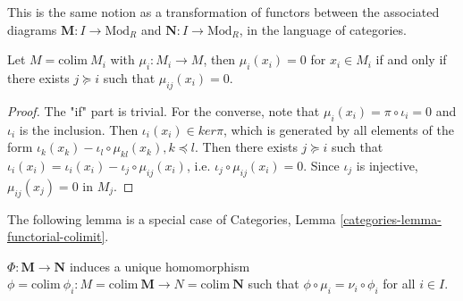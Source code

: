 \noindent
This is the same notion as a transformation of functors
between the associated diagrams $\textbf{M} : I \to \text{Mod}_R$
and $\textbf{N} : I \to \text{Mod}_R$, in the language of
categories.

\begin{lemma}
\label{lemma-zero-directed-limit}
Let $M=\text{colim}\ M_i$ with $\mu_i:M_i\rightarrow M$,
then $\mu_i(x_i)=0$ for $x_i\in M_i$ if and only if
there exists $j\succeq i$ such that $\mu_{ij}(x_i)=0$.
\end{lemma}

\begin{proof}
The "if" part is trivial. For the converse, note that $\mu_i(x_i)=\pi \circ 
\iota_i=0$ and $\iota_{i}$ is the
inclusion. Then $\iota_{i}(x_i)\in ker\pi$, which is generated by all elements 
of the form
$\iota_{k}(x_k)-\iota_{l} \circ \mu_{kl}(x_k), k\preceq l$. Then there exists 
$j\succeq i$ such that
$\iota_{i}(x_i)=\iota_{i}(x_i)-\iota_{j} \circ \mu_{ij}(x_i)$, i.e. $\iota_{j} 
\circ \mu_{ij}(x_i)=0$. Since
$\iota_{j}$ is injective, $\mu_{ij}(x_j)=0$ in $M_j$.
\end{proof}

\noindent
The following lemma is a special case of
Categories, Lemma \ref{categories-lemma-functorial-colimit}.

\begin{lemma}
\label{lemma-homomorphism-limit}
$\Phi:\textbf{M}\rightarrow \textbf{N}$ induces a unique homomorphism
$\phi=\text{colim}\ \phi_{i}: M = \text{colim}\ \textbf{M}
\rightarrow N = \text{colim}\ \textbf{N}$ such that $\phi \circ 
\mu_{i}=\nu_{i} \circ \phi_{i}$ for all $i\in I$.
\end{lemma}

